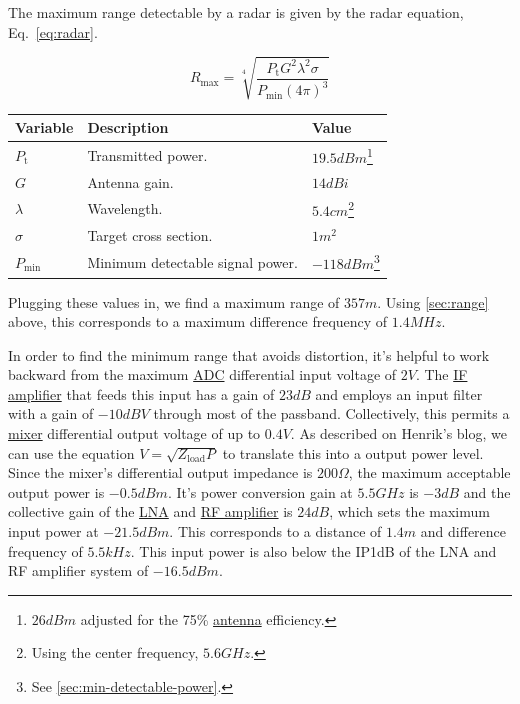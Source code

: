 The maximum range detectable by a radar is given by the radar equation, Eq.~\ref{eq:radar}.

\begin{equation}
        \label{eq:radar}
        R_{\text{max}} = \sqrt[4]{\frac{P_{\text{t}} G^2 \lambda^2 \sigma}{P_{\text{min}} {(4
              \pi)}^3}}
\end{equation}

\label{tab:radar-equation}
\begin{tabularx}{\textwidth}{l X l}
        \toprule
        Variable & Description & Value \\
        \midrule
        $P_{\text{t}}$ & Transmitted power. & $19.5 \si{dBm}$\footnote{$26 \si{dBm}$ adjusted for
          the 75\% \hyperref[sec:antenna-transmission]{antenna} efficiency.} \\
        $G$ & Antenna gain. & $14 \si{dBi}$ \\
        $\lambda$ & Wavelength. & $5.4 \si{cm}$\footnote{Using the center frequency, $5.6 \si{GHz}$.} \\
        $\sigma$ & Target cross section. & $1 \si{m^2}$ \\
        $P_{\text{min}}$ & Minimum detectable signal power. & $-118 \si{dBm}$\footnote{See
          \cref{sec:min-detectable-power}.} \\
        \bottomrule
\end{tabularx}

Plugging these values in, we find a maximum range of $357 \si{m}$. Using \cref{sec:range} above,
this corresponds to a maximum difference frequency of $1.4 \si{MHz}$.

In order to find the minimum range that avoids distortion, it's helpful to work backward from the
maximum \hyperref[sec:ltc2292]{ADC} differential input voltage of $2 \si{V}$. The
\hyperref[sec:ada4940-2]{IF amplifier} that feeds this input has a gain of $23 \si{dB}$ and employs
an input filter with a gain of $-10 \si{dBV}$ through most of the passband. Collectively, this
permits a \hyperref[sec:adl5802]{mixer} differential output voltage of up to $0.4 \si{V}$. As
described on Henrik's blog, we can use the equation $V = \sqrt{Z_{\text{load}} P}$ to translate this
into a output power level. Since the mixer's differential output impedance is $200 \si{\Omega}$, the
maximum acceptable output power is $-0.5 \si{dBm}$. It's power conversion gain at $5.5 \si{GHz}$ is
$-3 \si{dB}$ and the collective gain of the \hyperref[sec:sky65404]{LNA} and
\hyperref[sec:trf37a73]{RF amplifier} is $24 \si{dB}$, which sets the maximum input power at
$-21.5 \si{dBm}$. This corresponds to a distance of $1.4 \si{m}$ and difference frequency of
$5.5 \si{kHz}$. This input power is also below the IP1dB of the LNA and RF amplifier system of
$-16.5 \si{dBm}$.

